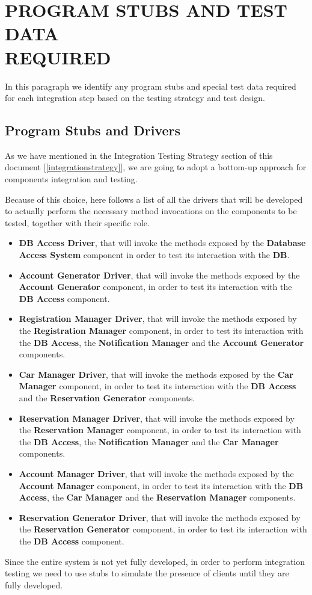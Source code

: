 \section{PROGRAM STUBS AND TEST DATA \\REQUIRED}
In this paragraph we identify any program stubs and special test data required for each integration step based on the testing strategy and test design. 

\subsection{Program Stubs and Drivers}
As we have mentioned in the Integration Testing Strategy section of this document [\ref{integrationstrategy}], we are going to adopt a bottom-up approach for components integration and testing.

Because of this choice, here follows a list of all the drivers that will be developed to actually perform the necessary method invocations on the components to be tested, together with their specific role.

\begin{itemize}
	\item \textbf{DB Access Driver}, that will invoke the methods exposed by the \textbf{Database Access System} component in order to test its interaction with the \textbf{DB}.
	\item \textbf{Account Generator Driver}, that will invoke the methods exposed by the \textbf{Account Generator} component, in order to test its interaction with the \textbf{DB Access} component.
	\item \textbf{Registration Manager Driver}, that will invoke the methods exposed by the \textbf{Registration Manager} component, in order to test its interaction with the \textbf{DB Access}, the \textbf{Notification Manager} and the \textbf{Account Generator} components.
	\item \textbf{Car Manager Driver}, that will invoke the methods exposed by the \textbf{Car Manager} component, in order to test its interaction with the \textbf{DB Access} and the \textbf{Reservation Generator} components.
	\item \textbf{Reservation Manager Driver}, that will invoke the methods exposed by the \textbf{Reservation Manager} component, in order to test its interaction with the \textbf{DB Access}, the \textbf{Notification Manager} and the \textbf{Car Manager} components.
	\item \textbf{Account Manager Driver}, that will invoke the methods exposed by the \textbf{Account Manager} component, in order to test its interaction with the \textbf{DB Access}, the \textbf{Car Manager} and the \textbf{Reservation Manager} components.
	\item \textbf{Reservation Generator Driver}, that will invoke the methods exposed by the \textbf{Reservation Generator} component, in order to test its interaction with the \textbf{DB Access} component.
\end{itemize}
Since the entire system is not yet fully developed, in order to perform integration testing we need to use stubs to simulate the presence of clients until they are fully developed.

